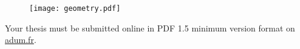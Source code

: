 \begin{figure}[h!tbp]
	\centering
	\texttt{[image: geometry.pdf]}
\end{figure}

Your thesis must be submitted online in PDF 1.5 minimum version format on \href{https://www.adum.fr/}{adum.fr}.

